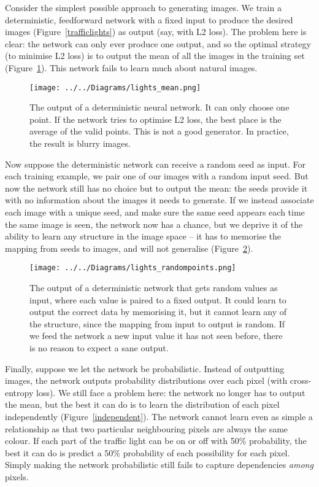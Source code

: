 \documentclass[11pt, a4paper, openany]{book}
\begin{document}
Consider the simplest possible approach to generating images. We train a deterministic, feedforward network with a fixed input to produce the desired images (Figure~\ref{trafficlights}) as output (say, with L2 loss). The problem here is clear: the network can only ever produce one output, and so the optimal strategy (to minimise L2 loss) is to output the mean of all the images in the training set (Figure~\ref{lightsmean}). This network fails to learn much about natural images.

\begin{figure}
  \centering
  \texttt{[image: ../../Diagrams/lights\_mean.png]}
  \caption[Output of a deterministic neural network]{The output of a deterministic neural network. It can only choose one point. If the network tries to optimise L2 loss, the best place is the average of the valid points. This is not a good generator. In practice, the result is blurry images.}
  \label{lightsmean}
\end{figure}

Now suppose the deterministic network can receive a random seed as input. For each training example, we pair one of our images with a random input seed. But now the network still has no choice but to output the mean: the seeds provide it with no information about the images it needs to generate. If we instead associate each image with a unique seed, and make sure the same seed appears each time the same image is seen, the network now has a chance, but we deprive it of the ability to learn any structure in the image space -- it has to memorise the mapping from seeds to images, and will not generalise (Figure~\ref{randompoints}).

\begin{figure}
  \centering
  \texttt{[image: ../../Diagrams/lights\_randompoints.png]}
  \caption[Output of a deterministic network with random values as input]{The output of a deterministic network that gets random values as input, where each value is paired to a fixed output. It could learn to output the correct data by memorising it, but it cannot learn any of the structure, since the mapping from input to output is random. If we feed the network a new input value it has not seen before, there is no reason to expect a sane output.}
  \label{randompoints}
\end{figure}

Finally, suppose we let the network be probabilistic. Instead of outputting images, the network outputs probability distributions over each pixel (with cross-entropy loss). We still face a problem here: the network no longer has to output the mean, but the best it can do is to learn the distribution of each pixel independently (Figure~\ref{independent}). The network cannot learn even as simple a relationship as that two particular neighbouring pixels are always the same colour. If each part of the traffic light can be on or off with 50\% probability, the best it can do is predict a 50\% probability of each possibility for each pixel. Simply making the network probabilistic still fails to capture dependencies \emph{among} pixels.
\end{document}
